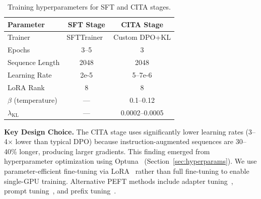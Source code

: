\begin{table}[H]
\centering
\small
\begin{tabular}{@{}lcc@{}}
\toprule
\textbf{Parameter} & \textbf{SFT Stage} & \textbf{CITA Stage} \\
\midrule
Trainer & SFTTrainer~\cite{tunstall2023zephyr} & Custom DPO+KL \\
Epochs & 3--5 & 3 \\
Sequence Length & 2048 & 2048 \\
Learning Rate & 2e-5 & 5--7e-6 \\
LoRA Rank~\cite{hu2022lora} & 8 & 8 \\
$\beta$ (temperature) & --- & 0.1--0.12 \\
$\lambda_{\text{KL}}$ & --- & 0.0002--0.0005 \\
\bottomrule
\end{tabular}
\caption{Training hyperparameters for SFT and CITA stages.}
\label{tab:training_config}
\vspace{-4mm}
\end{table}

\textbf{Key Design Choice.} The CITA stage uses significantly lower learning rates (3--4$\times$ lower than typical DPO) because instruction-augmented sequences are 30--40\% longer, producing larger gradients. This finding emerged from hyperparameter optimization using Optuna~\cite{akiba2019optuna} (Section~\ref{sec:hyperparams}). We use parameter-efficient fine-tuning via LoRA~\cite{hu2022lora,dettmers2023qlora} rather than full fine-tuning to enable single-GPU training. Alternative PEFT methods include adapter tuning~\cite{houlsby2019parameter}, prompt tuning~\cite{lester2021power}, and prefix tuning~\cite{li2021prefix}.
